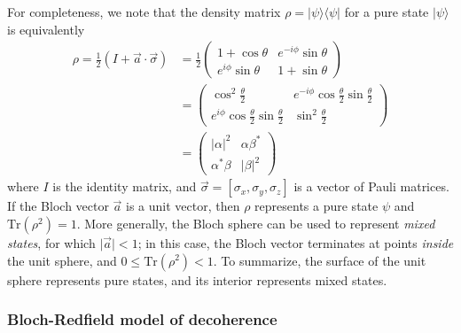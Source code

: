 \documentclass[aip,apr,twocolumn,showpacs,superscriptaddress,groupedaddress,nofootinbib,reprint]{revtex4-1}  %
\begin{document}
For completeness, we note that the density matrix $\rho=\lvert \psi \rangle \langle \psi \vert$ for a pure state $\lvert \psi \rangle$ is equivalently
%
\begin{align}
    \rho = \frac{1}{2}(I + \vec{a} \cdot \vec{\sigma})
    &= \frac{1}{2}
    \left(
        \begin{matrix}
            1+\cos \theta & e^{-i\phi} \sin \theta \\
            e^{i\phi} \sin \theta  & 1+ \sin \theta
        \end{matrix}
    \right) \\
     &= \left(
        \begin{matrix}
            \cos^2\frac{\theta}{2} & e^{-i\phi}\cos\frac{\theta}{2} \sin\frac{\theta}{2} \\
            e^{i\phi}\cos\frac{\theta}{2} \sin\frac{\theta}{2}  & \sin^2\frac{\theta}{2}
        \end{matrix}
    \right) \\
    &=\left(
        \begin{matrix}
            |\alpha|^2 & \alpha \beta^*  \\
            \alpha^* \beta  & |\beta|^2
        \end{matrix}
    \right)
    \label{eq:rho}
\end{align}
%
where $I$ is the identity matrix, and $\vec{\sigma} = [\sigma_x, \sigma_y, \sigma_z]$ is a vector of Pauli matrices. If the Bloch vector $\vec{a}$ is a unit vector, then $\rho$ represents a pure state $\psi$ and $\mathrm{Tr}(\rho^2)=1$. More generally, the Bloch sphere can be used to represent \textit{mixed states}, for which $\lvert \vec{a} \rvert < 1$; in this case, the Bloch vector terminates at points \textit{inside} the unit sphere, and $0\leq \mathrm{Tr}(\rho^2)<1$. To summarize, the surface of the unit sphere represents pure states, and its interior represents mixed states\cite{Nielsen2011}.

\subsubsection{Bloch-Redfield model of decoherence}
\end{document}
